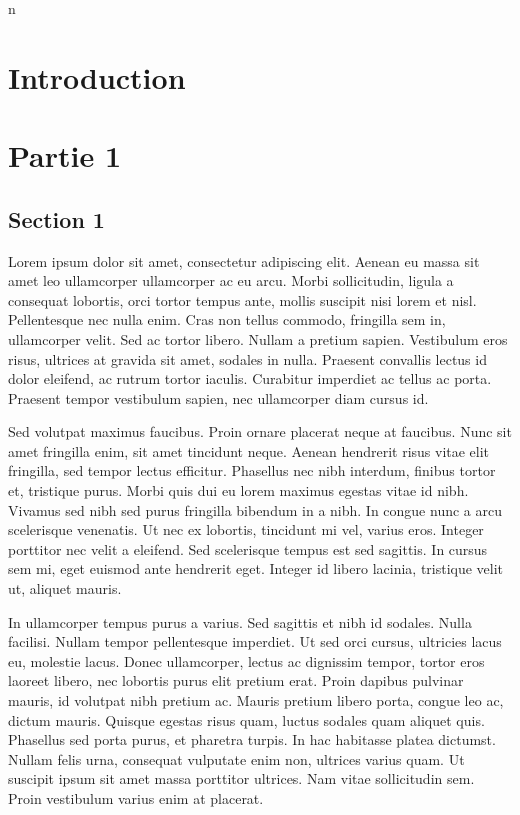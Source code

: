 n\documentclass{report}
\begin{document}
\chapter{Introduction}

\chapter{Partie 1}
\section{Section 1}
Lorem ipsum dolor sit amet, consectetur adipiscing elit. Aenean eu massa sit amet leo ullamcorper ullamcorper ac eu arcu. Morbi sollicitudin, ligula a consequat lobortis, orci tortor tempus ante, mollis suscipit nisi lorem et nisl. Pellentesque nec nulla enim. Cras non tellus commodo, fringilla sem in, ullamcorper velit. Sed ac tortor libero. Nullam a pretium sapien. Vestibulum eros risus, ultrices at gravida sit amet, sodales in nulla. Praesent convallis lectus id dolor eleifend, ac rutrum tortor iaculis. Curabitur imperdiet ac tellus ac porta. Praesent tempor vestibulum sapien, nec ullamcorper diam cursus id.

Sed volutpat maximus faucibus. Proin ornare placerat neque at faucibus. Nunc sit amet fringilla enim, sit amet tincidunt neque. Aenean hendrerit risus vitae elit fringilla, sed tempor lectus efficitur. Phasellus nec nibh interdum, finibus tortor et, tristique purus. Morbi quis dui eu lorem maximus egestas vitae id nibh. Vivamus sed nibh sed purus fringilla bibendum in a nibh. In congue nunc a arcu scelerisque venenatis. Ut nec ex lobortis, tincidunt mi vel, varius eros. Integer porttitor nec velit a eleifend. Sed scelerisque tempus est sed sagittis. In cursus sem mi, eget euismod ante hendrerit eget. Integer id libero lacinia, tristique velit ut, aliquet mauris.

In ullamcorper tempus purus a varius. Sed sagittis et nibh id sodales. Nulla facilisi. Nullam tempor pellentesque imperdiet. Ut sed orci cursus, ultricies lacus eu, molestie lacus. Donec ullamcorper, lectus ac dignissim tempor, tortor eros laoreet libero, nec lobortis purus elit pretium erat. Proin dapibus pulvinar mauris, id volutpat nibh pretium ac. Mauris pretium libero porta, congue leo ac, dictum mauris. Quisque egestas risus quam, luctus sodales quam aliquet quis. Phasellus sed porta purus, et pharetra turpis. In hac habitasse platea dictumst. Nullam felis urna, consequat vulputate enim non, ultrices varius quam. Ut suscipit ipsum sit amet massa porttitor ultrices. Nam vitae sollicitudin sem. Proin vestibulum varius enim at placerat.
\end{document}

